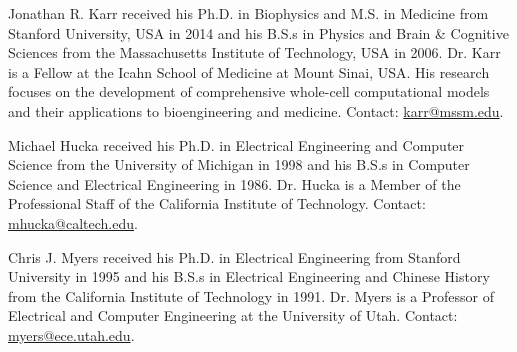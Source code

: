 \documentclass[journal,transmag]{IEEEtran}
\begin{document}
\begin{IEEEbiography}{Jonathan R. Karr}
received his Ph.D. in Biophysics and M.S. in Medicine from Stanford University, USA in 2014 and his B.S.s in Physics and Brain \& Cognitive Sciences from the Massachusetts Institute of Technology, USA in 2006. 
Dr. Karr is a Fellow at the Icahn School of Medicine at Mount Sinai, USA. 
His research focuses on the development of comprehensive whole-cell computational models and their applications to bioengineering and medicine. 
Contact: \href{mailto:karr@mssm.edu}{karr@mssm.edu}.
\end{IEEEbiography}

\begin{IEEEbiography}{Michael Hucka}
received his Ph.D. in Electrical Engineering and Computer Science from the University of Michigan in 1998 and his B.S.s in Computer Science and Electrical Engineering in 1986.
Dr. Hucka is a Member of the Professional Staff of the California Institute of Technology.
Contact: \href{mailto:mhucka@caltech.edu}{mhucka@caltech.edu}.
\end{IEEEbiography}

\begin{IEEEbiography}{Chris J. Myers}
received his Ph.D. in Electrical Engineering from Stanford University in 1995 and his B.S.s in Electrical Engineering and Chinese History from the California Institute of Technology in 1991.
Dr. Myers is a Professor of Electrical and Computer Engineering at the University of Utah.
Contact: \href{mailto:myers@ece.utah.edu}{myers@ece.utah.edu}.
\end{IEEEbiography}
\end{document}
